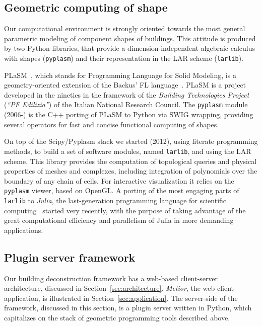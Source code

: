 \vspace{-3mm}\subsection{Geometric computing of shape}\vspace{-3mm}

Our computational environment is strongly oriented towards the most general parametric modeling of component shapes of buildings. This attitude is produced by two Python libraries, that provide a dimension-independent algebraic calculus with shapes (\texttt{pyplasm}) and their representation in the LAR scheme (\texttt{larlib}). 

PLaSM~\cite{Paoluzzi:1995:GPP:212332.212349,Paoluzzi:2001:GPC:600092}, which stands for Programming Language for Solid Modeling, is a geometry-oriented extension of the Backus' FL language~\cite{backus:78,BWWLA89}.  PLaSM is a project developed in the nineties in the framework of the \emph{Building Technologies Project} (\emph{``PF Edilizia''}) of the Italian National Research Council. The \texttt{pyplasm} module (2006-) is the C++ porting of PLaSM to Python via SWIG wrapping, providing several operators for fast and concise functional computing of shapes.

On top of the Scipy/Pyplasm stack we started (2012), using literate programming methods, to build a set of software modules, named \texttt{larlib}, and using the LAR scheme. This library provides the computation of topological queries and physical properties of meshes and complexes, including integration of polynomials over the boundary of any chain of cells. For interactive visualization it relies on the \texttt{pyplasm} viewer, based on OpenGL.
A porting of the most engaging parts of \texttt{larlib} to \emph{Julia}, the last-generation programming language  for scientific computing~\cite{BEKS14} started very recently, with the purpose of taking advantage of the great computational efficiency and parallelism of Julia in more demanding applications. 

\vspace{-3mm}\subsection{Plugin server framework}\vspace{-3mm}

Our building deconstruction framework  has a web-based client-server architecture,  discussed in Section~\ref{sec:architecture}. 	\emph{Metior}, the web client application, is illustrated in Section~\ref{sec:application}. The server-side of the framework, discussed in this section, is a  plugin server written in Python, which capitalizes on the stack of geometric programming tools described above. 

